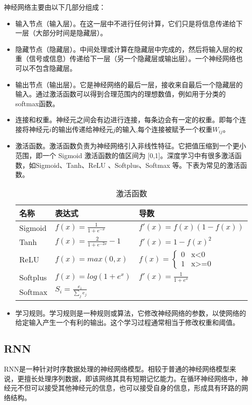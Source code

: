 神经网络主要由以下几部分组成：
\begin{itemize}
    \item 输入节点（输入层）。在这一层中不进行任何计算，它们只是将信息传递给下一层（大部分时间是隐藏层）。
    \item 隐藏节点（隐藏层）。中间处理或计算在隐藏层中完成的，然后将输入层的权重（信号或信息）传递给下一层（另一个隐藏层或输出层）。一个神经网络也可以不包含隐藏层。
    \item 输出节点（输出层）。它是神经网络的最后一层，接收来自最后一个隐藏层的输入。通过激活函数可以得到合理范围内的理想数值，例如用于分类的softmax函数。
    \item 连接和权重。神经元之间会有边进行连接，每条边会有一定的权重。即每个连接将神经元$i$的输出传递给神经元$j$的输入,每个连接被赋予一个权重$W_{ij}$。
    \item 激活函数。激活函数负责为神经网络引入非线性特征。它把值压缩到一个更小范围，即一个 Sigmoid 激活函数的值区间为 [0,1]。深度学习中有很多激活函数，如Sigmoid、Tanh、ReLU 、Softplus、Softmax 等。下表为常见的激活函数。
    \begin{table}[]
        \caption{激活函数}
        \centering
        \begin{tabular}{|l|l|l|}
        \hline
        名称&表达式&导数\\ \hline
        Sigmoid &  $f(x) = \frac{1}{1+e^{-x}}$ & $f'(x) = f(x)(1-f(x))$
        \\ \hline
        Tanh & $f(x) = \frac{2}{1+e^{-2x}} - 1$ & $f'(x) = 1 - f(x)^2$ \\ \hline
        ReLU & $f(x) = max(0, x)$ & $f(x)=\begin{cases}
        0& \text{x<0}\\
        1& \text{x>=0}
        \end{cases}$ \\ \hline
        Softplus & $f(x) = log(1+e^x)$ & $f'(x) = \frac{1}{1+e^x}$ \\ \hline
        Softmax & $S_i = \frac{e_i}{\sum_j e_j}$ & \\ \hline
        \end{tabular}
        \end{table}
    \item 学习规则。学习规则是一种规则或算法，它修改神经网络的参数，以使网络的给定输入产生一个有利的输出。这个学习过程通常相当于修改权重和阈值。
\end{itemize}

\subsection{RNN}
RNN是一种针对时序数据处理的神经网络模型。相较于普通的神经网络模型来说，更擅长处理序列数据，即该网络其具有短期记忆能力。在循环神经网络中，神经元不但可以接受其他神经元的信息，也可以接受自身的信息，形成具有环路的网络结构。

